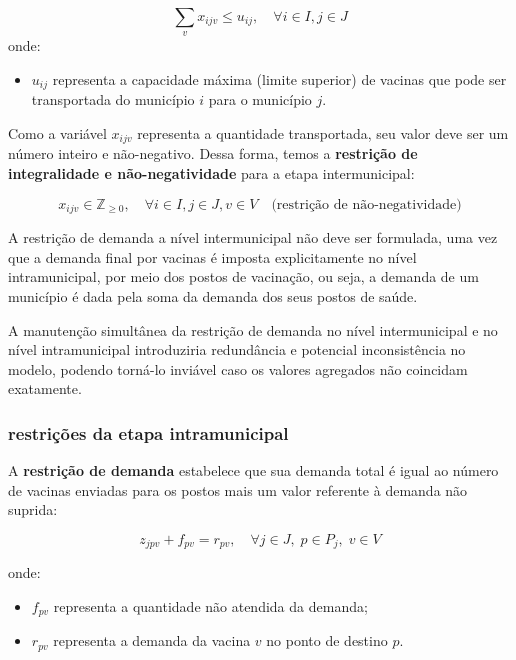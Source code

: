 \begin{equation*}
    \sum_{v} x_{ijv} \le u_{ij}, \quad \forall i \in I, j \in J
\end{equation*}
onde:
\begin{itemize}
    \item $u_{ij}$ representa a capacidade máxima (limite superior) de vacinas que pode ser transportada do município $i$ para o município $j$.
\end{itemize}

Como a variável $x_{ijv}$ representa a quantidade transportada, seu valor deve ser um número inteiro e não-negativo. Dessa forma, temos a \textbf{restrição de integralidade e não-negatividade} para a etapa intermunicipal:

\begin{equation*}
    x_{ijv} \in \mathbb{Z}_{\geq 0}, \quad \forall i \in I, j \in J, v \in V \quad \text{(restrição de não-negatividade)}
\end{equation*}

A restrição de demanda a nível intermunicipal não deve ser formulada, uma vez que a demanda final por vacinas é imposta explicitamente no nível intramunicipal, por meio dos postos de vacinação, ou seja, a demanda de um município é dada pela soma da demanda dos seus postos de saúde.

A manutenção simultânea da restrição de demanda no nível intermunicipal e no nível intramunicipal introduziria redundância e potencial inconsistência no modelo, podendo torná-lo inviável caso os valores agregados não coincidam exatamente.


\subsubsection{restrições da etapa intramunicipal}

A \textbf{restrição de demanda} estabelece que sua demanda total é igual ao número de vacinas enviadas para os postos mais um valor referente à demanda não suprida:

\begin{equation}
z_{jpv} + f_{pv} = r_{pv},
\quad \forall j \in J,\; p \in P_j,\; v \in V
\end{equation}

onde:
\begin{itemize}
    \item $f_{pv}$ representa a quantidade não atendida da demanda;
    \item $r_{pv}$ representa a demanda da vacina $v$ no ponto de destino $p$.
\end{itemize}

